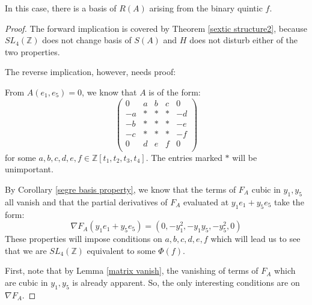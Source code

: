 \documentclass{article}
\begin{document}
In this case, there is a basis of $R(A)$ arising from the binary quintic $f$.
\begin{proof}

The forward implication is covered by Theorem \ref{sextic structure2}, because $SL_4(\mathbb{Z})$ does not change basis of $S(A)$ and $H$ does not disturb either of the two properties.

The reverse implication, however, needs proof:

From $A(e_1,e_5) = 0$, we know that $A$ is of the form:
\begin{equation}
\begin{pmatrix}
0 & a & b & c & 0 \\
- a & * & * & * & - d \\
- b & * & * & * & - e \\
- c & * & * & * & - f \\
0 & d & e & f & 0 \\
\end{pmatrix}
\end{equation}
for some $a,b,c,d,e,f \in \mathbb{Z}[t_1,t_2,t_3,t_4]$.  The entries marked $*$ will be unimportant.

By Corollary \ref{segre basis property}, we know that the terms of $F_A$ cubic in $y_1, y_5$ all vanish and that the partial derivatives of $F_A$ evaluated at $y_1 e_1 + y_5 e_5$ take the form:
\begin{equation}
\nabla F_A (y_1 e_1 + y_5 e_5) = (0, - y_1^2, - y_1 y_5, - y_5^2, 0)
\end{equation}
These properties will impose conditions on $a,b,c,d,e,f$ which will lead us to see that we are $SL_4(\mathbb{Z})$ equivalent to some $\Phi(f)$.

First, note that by Lemma \ref{matrix vanish}, the vanishing of terms of $F_A$ which are cubic in $y_1, y_5$ is already apparent.  So, the only interesting conditions are on $\nabla F_A$.


\end{proof}
\end{document}
